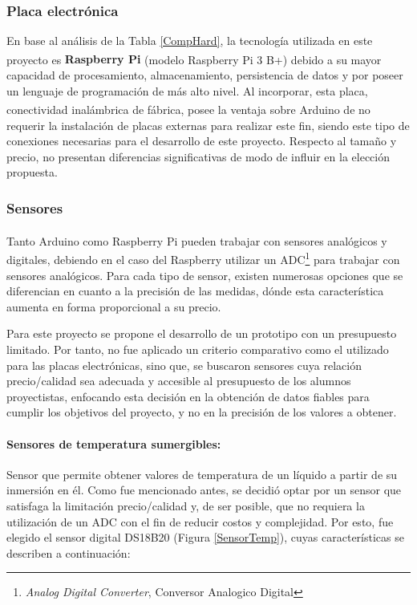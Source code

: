         \subsubsection{Placa electrónica}
            \par En base al análisis de la Tabla \ref{CompHard}, la tecnología utilizada en este proyecto es \textbf{Raspberry\textsuperscript{\textregistered} Pi} (modelo Raspberry\textsuperscript{\textregistered} Pi 3 B+) debido a su mayor capacidad de procesamiento, almacenamiento, persistencia de datos y por poseer un lenguaje de programación de más alto nivel. Al incorporar, esta placa, conectividad inalámbrica de fábrica, posee la ventaja sobre Arduino\textsuperscript{\textregistered} de no requerir la instalación de placas externas para realizar este fin, siendo este tipo de conexiones necesarias para el desarrollo de este proyecto. Respecto al tamaño y precio, no presentan diferencias significativas de modo de influir en la elección propuesta.

        \subsubsection{Sensores}
            \par Tanto Arduino\textsuperscript{\textregistered} como Raspberry\textsuperscript{\textregistered} Pi pueden trabajar con sensores analógicos y digitales, debiendo en el caso del Raspberry\textsuperscript{\textregistered} utilizar un ADC\footnote{\textit{Analog Digital Converter}, Conversor Analogico Digital} para trabajar con sensores analógicos. Para cada tipo de sensor, existen numerosas opciones que se diferencian en cuanto a la precisión de las medidas, dónde esta característica aumenta en forma proporcional a su precio. 
            
            \par Para este proyecto se propone el desarrollo de un prototipo con un presupuesto limitado. Por tanto, no fue aplicado un criterio comparativo como el utilizado para las placas electrónicas, sino que, se buscaron sensores cuya relación precio/calidad sea adecuada y accesible al presupuesto de los alumnos proyectistas, enfocando esta decisión en la obtención de datos fiables para cumplir los objetivos del proyecto, y no en la precisión de los valores a obtener.
            
            \paragraph{Sensores de temperatura sumergibles:}Sensor que permite obtener valores de temperatura de un líquido a partir de su inmersión en él. Como fue mencionado antes, se decidió optar por un sensor que satisfaga la limitación precio/calidad y, de ser posible, que no requiera la utilización de un ADC con el fin de reducir costos y complejidad. Por esto, fue elegido el sensor digital DS18B20 (Figura \ref{SensorTemp}), cuyas características se describen a continuación:
            
